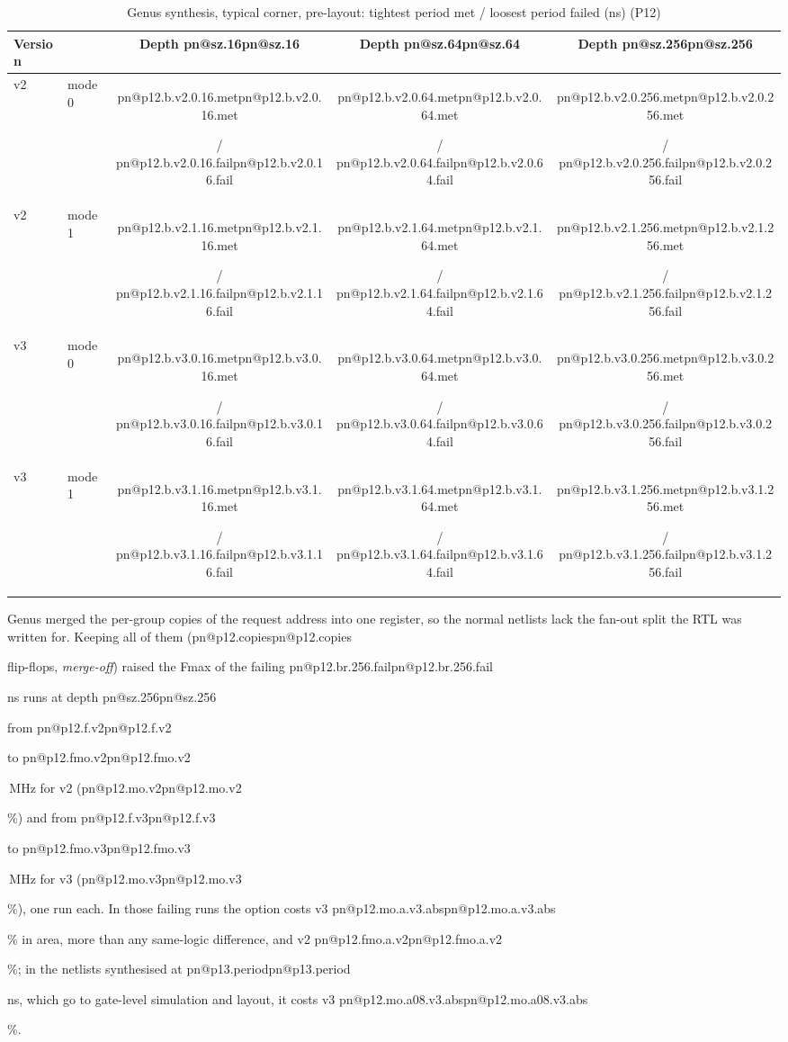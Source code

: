 \documentclass[11pt,a4paper]{report}
\makeatletter
\DeclareRobustCommand{\R}[1]{\ifcsname pn@#1\endcsname\csname pn@#1\endcsname\else
  \PackageError{report}{number key '#1' is not defined in macros.tex}{Run tools/make_paper_macros.py --target report}\fi}
\makeatother
\begin{document}
\begin{table}[ht]
\centering
\caption{Genus synthesis, typical corner, pre-layout: tightest period met / loosest period failed (ns) (P12)}
\label{tab:p12}
\begin{tabular}{@{}llccc@{}}
\toprule
Version & & Depth \R{sz.16} & Depth \R{sz.64} & Depth \R{sz.256} \\
\midrule
v2 & mode 0 & \R{p12.b.v2.0.16.met} / \R{p12.b.v2.0.16.fail} & \R{p12.b.v2.0.64.met} / \R{p12.b.v2.0.64.fail} & \R{p12.b.v2.0.256.met} / \R{p12.b.v2.0.256.fail} \\
v2 & mode 1 & \R{p12.b.v2.1.16.met} / \R{p12.b.v2.1.16.fail} & \R{p12.b.v2.1.64.met} / \R{p12.b.v2.1.64.fail} & \R{p12.b.v2.1.256.met} / \R{p12.b.v2.1.256.fail} \\
v3 & mode 0 & \R{p12.b.v3.0.16.met} / \R{p12.b.v3.0.16.fail} & \R{p12.b.v3.0.64.met} / \R{p12.b.v3.0.64.fail} & \R{p12.b.v3.0.256.met} / \R{p12.b.v3.0.256.fail} \\
v3 & mode 1 & \R{p12.b.v3.1.16.met} / \R{p12.b.v3.1.16.fail} & \R{p12.b.v3.1.64.met} / \R{p12.b.v3.1.64.fail} & \R{p12.b.v3.1.256.met} / \R{p12.b.v3.1.256.fail} \\
\bottomrule
\end{tabular}
\end{table}

Genus merged the per-group copies of the request address into one register, so the normal netlists lack the fan-out
split the RTL was written for. Keeping all of them (\R{p12.copies} flip-flops, \emph{merge-off}) raised the Fmax of
the failing \R{p12.br.256.fail} ns runs at depth \R{sz.256} from \R{p12.f.v2} to \R{p12.fmo.v2}\,MHz for v2
(\R{p12.mo.v2}\%) and from \R{p12.f.v3} to \R{p12.fmo.v3}\,MHz for v3 (\R{p12.mo.v3}\%), one run each. In those
failing runs the option costs v3 \R{p12.mo.a.v3.abs}\% in area, more than any same-logic difference, and v2
\R{p12.fmo.a.v2}\%; in the netlists synthesised at \R{p13.period} ns, which go to gate-level simulation and layout, it
costs v3 \R{p12.mo.a08.v3.abs}\%.
\end{document}
